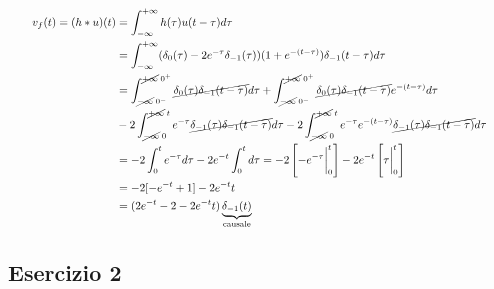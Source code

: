 \documentclass[a4paper]{article}
\begin{document}
\begin{equation*}
    \scalebox{0.8}
    {
    $\begin{aligned}
        v_f(t) = (h \ast u)(t) &= \int_{-\infty}^{+\infty}h(\tau)u(t-\tau)d\tau\\
        &= \int_{-\infty}^{+\infty}(\delta_0(\tau) - 2e^{-\tau}\delta_{-1}(\tau))(1+e^{-(t-\tau)})\delta_{-1}(t-\tau)d\tau\\
        &= \int_{\cancel{-\infty}\; 0^-}^{\cancel{+\infty}\; 0^+} \cancel{\delta_0(\tau)\delta_{-1}(t-\tau)}d\tau + \int_{\cancel{-\infty}\; 0^-}^{\cancel{+\infty}\; 0^+} \cancel{\delta_0(\tau)\delta_{-1}(t-\tau)}e^{-(t-\tau)}d\tau\\
        &- 2\int_{\cancel{-\infty}\; 0}^{\cancel{+\infty}\; t} e^{-\tau}\cancel{\delta_{-1}(\tau)\delta_{-1}(t-\tau)}d\tau - 2\int_{\cancel{-\infty}\; 0}^{\cancel{+\infty}\; t} e^{-\tau}e^{-(t-\tau)}\cancel{\delta_{-1}(\tau)\delta_{-1}(t-\tau)}d\tau\\
        &= -2 \int_{0}^{t} e^{-\tau} d\tau - 2e^{-t}\int_{0}^{t}d\tau = -2\left[-e^{-\tau}\bigg|_{0}^t\right] -2e^{-t}\left[\tau\bigg|_{0}^t\right]\\
        &= -2[-e^{-t} + 1] -2e^{-t}t\\
        &= (2e^{-t} - 2 - 2e^{-t}t)\underbrace{\delta_{-1}(t)}_{\text{causale}}
    \end{aligned}$
    }
\end{equation*}

\subsection{Esercizio 2}
\end{document}
